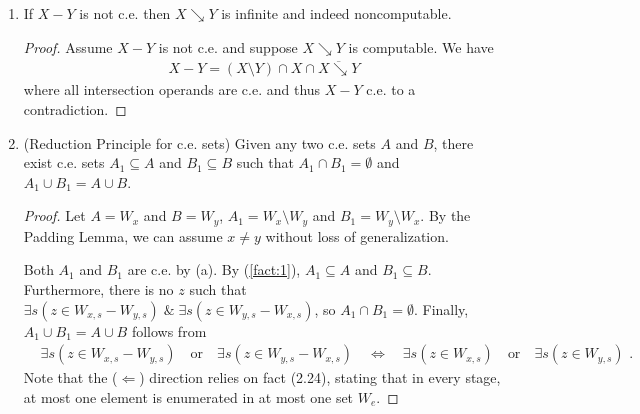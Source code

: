 \documentclass[a4paper,11pt]{article}
\begin{document}
\begin{enumerate}[label=(\alph*)]
\item If $X - Y$ is not c.e. then $X \searrow Y$ is infinite and indeed noncomputable.
\begin{proof}
  Assume $X - Y$ is not c.e. and suppose $X \searrow Y$ is computable. We have
  \begin{align*}
    X - Y = (X \setminus Y) \cap X \cap \overline{X \searrow Y}
  \end{align*}
  where all intersection operands are c.e. and thus $X - Y$ c.e. to a contradiction.
\end{proof}

\item (Reduction Principle for c.e. sets) Given any two c.e. sets $A$ and $B$,
  there exist c.e. sets $A_1 \subseteq A$ and $B_1 \subseteq B$ such that
  $A_1 \cap B_1 = \emptyset$ and $A_1 \cup B_1 = A \cup B$.
\begin{proof}
  Let $A = W_x$ and $B = W_y$, $A_1 = W_x \setminus W_y$ and $B_1 = W_y \setminus W_x$.
  By the Padding Lemma, we can assume $x \neq y$ without loss of generalization.

  Both $A_1$ and $B_1$ are c.e. by (a).
  By (\ref{fact:1}), $A_1 \subseteq A$ and $B_1 \subseteq B$.
  Furthermore, there is no $z$ such that $\exists s(z \in W_{x,s} - W_{y,s}) \; \& \; \exists s(z \in W_{y,s} - W_{x,s})$, so $A_1 \cap B_1 = \emptyset$.
  Finally, $A_1 \cup B_1 = A \cup B$ follows from
  \begin{align*}
    & \exists s(z \in W_{x,s} - W_{y,s}) \quad\! \text{or} \quad\! \exists s(z \in W_{y,s} - W_{x,s}) \quad\! \Longleftrightarrow \quad\! \exists s(z \in W_{x,s}) \quad\! \text{or} \quad\! \exists s(z \in W_{y,s}) \text{ .}
  \end{align*}
  Note that the ($\Leftarrow$) direction relies on fact (2.24), stating that in every stage, at most one element is enumerated in at most one set $W_e$.
\end{proof}

\end{enumerate}
\end{document}
